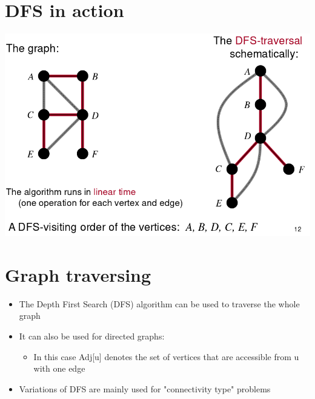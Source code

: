 \documentclass{article}[18pt]
\begin{document}
\section{DFS in action}
\begin{center}
	\includegraphics[scale=0.7]{DFS}
\end{center}
\section{Graph traversing}
\begin{itemize}
	\item The Depth First Search (DFS) algorithm can be used to traverse the whole graph
	\item It can also be used for directed graphs:
	\begin{itemize}
		\item In this case Adj[u] denotes the set of vertices that are accessible from u with one edge
	\end{itemize}
	\item Variations of DFS are mainly used for "connectivity type" problems
\end{itemize}
\end{document}
